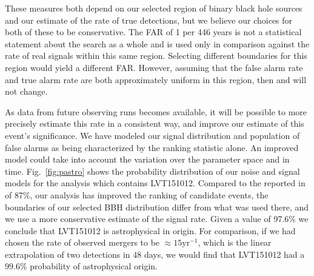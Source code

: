 These measures both depend on our selected region of binary black hole sources
and our estimate of the rate of true detections, but we believe our choices for
both of these to be conservative. The FAR of 1 per 446 years is not a
statistical statement about the search as a whole and is used only in
comparison against the rate of real signals within this same region. Selecting
different boundaries for this region would yield a different FAR. However,
assuming that the false alarm rate and true alarm rate are both approximately
uniform in this region, then \pastro{} and \tdr{} will not change.


As data from future observing runs becomes available, it will be possible to more precisely estimate this rate in a consistent way, and improve our estimate of this event's significance.  We have modeled our signal distribution and population of false alarms as being characterized by the ranking statistic \rankingstat{} alone. An improved model could take into account the variation over the parameter space and in time. Fig.~\ref{fig:pastro} shows the probability distribution of our noise and signal models for the analysis which contains LVT151012. Compared to the \pastro{} reported in~\cite{TheLIGOScientific:2016pea} of 87\%, our analysis has improved the ranking of candidate events, the boundaries of our selected BBH distribution differ from what was used there, and we use a more conservative estimate of the signal rate. Given a \pastro{} value of 97.6$\%$ we conclude that LVT151012 is astrophysical in origin. For comparison, if we had chosen the rate of observed mergers to be $\approx 15 \mathrm{yr}^{-1}$, which is the linear extrapolation of two detections in 48 days, we would find that LVT151012 had a $99.6\%$ probability of astrophysical origin.

\newpage

